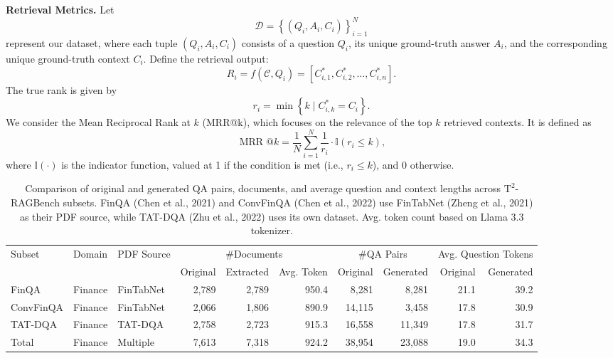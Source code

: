 \documentclass[10pt]{article}
\begin{document}
\textbf{Retrieval Metrics.} Let
\begin{equation}
\mathcal{D} = \left\{\left(Q_{i}, A_{i}, C_{i}\right) \right\}_{i = 1}^{N}
\end{equation}
represent our dataset, where each tuple $(Q_{i}, A_{i}, C_{i})$ consists of a question $Q_{i}$, its unique ground-truth answer $A_{i}$, and the corresponding unique ground-truth context $C_{i}$. Define the retrieval output:
\begin{equation}
R_{i} = f(\mathcal{C}, Q_{i}) = \left[ C_{i, 1}^{*}, C_{i, 2}^{*}, \dots, C_{i, n}^{*} \right].
\end{equation}
The true rank is given by
\begin{equation}
r_{i} = \min \left\{k \mid C_{i, k}^{*} = C_{i} \right\}.
\end{equation}
We consider the Mean Reciprocal Rank at $k$ (MRR@k), which focuses on the relevance of the top $k$ retrieved contexts. It is defined as
\begin{equation}
\operatorname{MRR}@k = \frac{1}{N} \sum_{i = 1}^{N} \frac{1}{r_{i}} \cdot \mathbb{I}(r_{i} \leq k),
\end{equation}
where $\mathbb{I}(\cdot)$ is the indicator function, valued at 1 if the condition is met (i.e., $r_i \leq k$), and 0 otherwise.

\begin{table}[t]
\centering
\begin{tabular}{|l|l|l|r|r|r|r|r|r|r|}
\hline
Subset & Domain & PDF Source & \multicolumn{3}{c|}{\#Documents} & \multicolumn{2}{c|}{\#QA Pairs} & \multicolumn{2}{c|}{Avg. Question Tokens} \\
\cline{4-10}
 & & & Original & Extracted & Avg. Token & Original & Generated & Original & Generated \\
\hline
FinQA & Finance & FinTabNet & 2,789 & 2,789 & 950.4 & 8,281 & 8,281 & 21.1 & 39.2 \\
ConvFinQA & Finance & FinTabNet & 2,066 & 1,806 & 890.9 & 14,115 & 3,458 & 17.8 & 30.9 \\
TAT-DQA & Finance & TAT-DQA & 2,758 & 2,723 & 915.3 & 16,558 & 11,349 & 17.8 & 31.7 \\
\hline
Total & Finance & Multiple & 7,613 & 7,318 & 924.2 & 38,954 & 23,088 & 19.0 & 34.3 \\
\hline
\end{tabular}
\caption{Comparison of original and generated QA pairs, documents, and average question and context lengths across $\mathrm{T}^2$-RAGBench subsets. FinQA (Chen et al., 2021) and ConvFinQA (Chen et al., 2022) use FinTabNet (Zheng et al., 2021) as their PDF source, while TAT-DQA (Zhu et al., 2022) uses its own dataset. Avg. token count based on Llama 3.3 tokenizer.}
\end{table}
\end{document}
